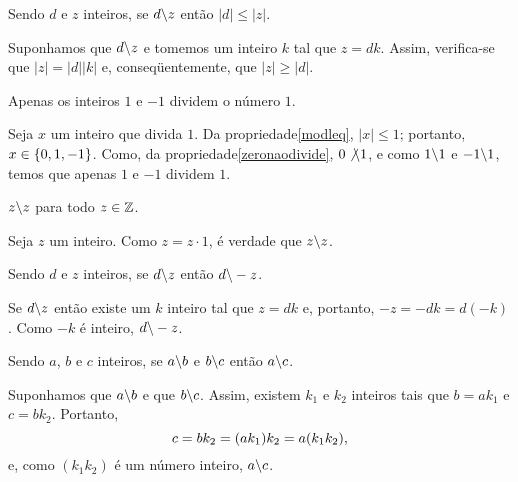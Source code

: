 \begin{Propr}\label{modleq}
  Sendo $d$ e $z$ inteiros, se $d\backslash z$ então $|d|\leq|z|$.
\end{Propr}

\begin{dem}
  Suponhamos que $d\backslash z$ e tomemos um inteiro $k$ tal
  que $z = dk$. Assim, verifica-se que $|z| = |d||k|$ e,
  conseqüentemente, que $|z|\geq |d|$.
\end{dem}

\begin{Propr}
  Apenas os inteiros $1$ e $-1$ dividem o número $1$.
\end{Propr}

\begin{dem}
  Seja $x$ um inteiro que divida $1$. Da propriedade\xspace\ref{modleq},
  $|x|\leq 1$; portanto, $x\in\left\{ 0,1,-1 \right\}$. Como,
  da propriedade\xspace\ref{zeronaodivide}, $0\not{\backslash} 1$, e como
  $1\backslash 1$
  e $-1\backslash 1$, temos que apenas $1$ e $-1$
  dividem $1$.
\end{dem}

\begin{Propr}
  $z\backslash z$ para todo $z\in\mathbb{Z}$.
\end{Propr}

\begin{dem}
  Seja $z$ um inteiro. Como $z = z\cdot 1$, é verdade que $z\backslash z$.
\end{dem}

\begin{Propr}\label{divideoposto}
  Sendo $d$ e $z$ inteiros, se $d\backslash z$ então $d\backslash -z$.
\end{Propr}

\begin{dem}
  Se $d\backslash z$ então existe um $k$ inteiro
  tal que $z = dk$ e, portanto, $-z = -dk = d(-k)$. Como $-k$ é inteiro,
  $d\backslash -z$.
\end{dem}

\begin{Propr}
  Sendo $a$, $b$ e $c$ inteiros, se $a\backslash b$ e $b\backslash c$ então
  $a\backslash c$.
\end{Propr}

\begin{dem}
  Suponhamos que $a\backslash b$ e que
  $b\backslash c$. Assim, existem $k_1$ e $k_2$ inteiros tais que $b=ak_1$ e
  $c=bk_2$.
  Portanto,
  \begin{equation*}
      c = bk_2
        = (ak_1)k_2
        = a(k_1k_2)\mathrm{,}
  \end{equation*}
  e, como $(k_1k_2)$ é um número inteiro, $a\backslash c$.
\end{dem}

